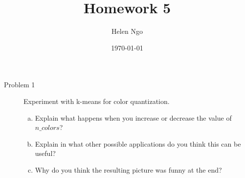 \documentclass[a4paper]{article}
\title{Homework 5}
\author{Helen Ngo}
\date{\today}
\begin{document}
\lstset{language=Python,basicstyle=\ttfamily\footnotesize}

\maketitle

\begin {description}

\item[Problem 1] Experiment with k-means for color quantization.

\begin{enumerate}[(e) i.]
\item Explain what happens when you increase or decrease the value of $n\_colors$?
\item Explain in what other possible applications do you think this can be useful?
\item Why do you think the resulting picture was funny at the end?
\end{enumerate}


\end{description}
\end{document}
